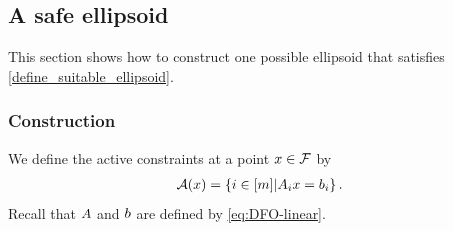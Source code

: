 

\subsection{A safe ellipsoid}

This section shows how to construct one possible ellipsoid that satisfies \cref{define_suitable_ellipsoid}.

\subsubsection{Construction}
\label{the_safe_ellipsoid}

We define the active constraints at a point $x \in {\mathcal F}$ by
\begin{align}
{\mathcal A}(x) = \left\{i \in [m] | {{A}}_ix = {{b}}_i \right\}. \label{define_activei}
\end{align}
Recall that ${A}$ and ${b}$ are defined by \cref{eq:DFO-linear}.

